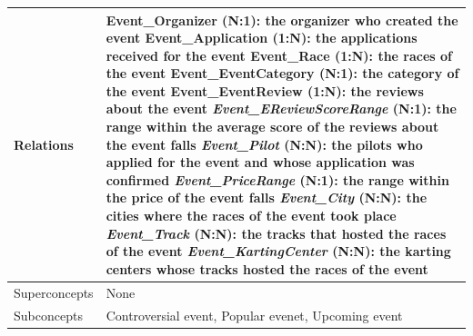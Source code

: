 \documentclass{beamer}
\begin{document}
\begin{frame}
\begin{table}
\tiny
\begin{tabular}{|p{2cm}|p{6cm}|}
\hline
Relations &
Event\_Organizer (N:1): the organizer who created the event \newline
Event\_Application (1:N): the applications received for the event \newline
Event\_Race (1:N): the races of the event \newline
Event\_EventCategory (N:1): the category of the event \newline
Event\_EventReview (1:N): the reviews about the event \newline
\textit{Event\_EReviewScoreRange} (N:1): the range within the average score of the reviews about the event falls \newline
\textit{Event\_Pilot} (N:N): the pilots who applied for the event and whose application was confirmed \newline
\textit{Event\_PriceRange} (N:1): the range within the price of the event falls \newline
\textit{Event\_City} (N:N): the cities where the races of the event took place \newline
\textit{Event\_Track} (N:N): the tracks that hosted the races of the event \newline
\textit{Event\_KartingCenter} (N:N): the karting centers whose tracks hosted the races of the event \\
\hline
Superconcepts & None \\
\hline
Subconcepts & Controversial event, Popular evenet, Upcoming event \\
\hline
\end{tabular}
\end{table}
\end{frame}










\end{document}
